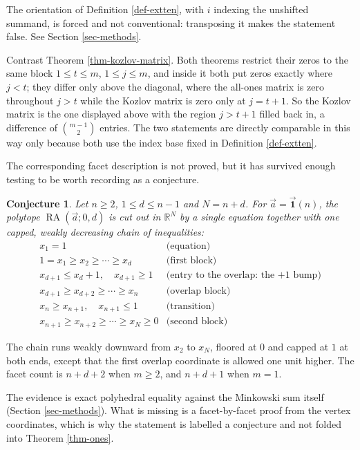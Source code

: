 \documentclass[11pt, a4paper, abstract=yes]{scrartcl}
\theoremstyle{definition}
\theoremstyle{remark}
\theoremstyle{plain}
\newtheorem{conjecture}[definition]{Conjecture}
\newcommand{\RA}{\operatorname{RA}}
\newcommand{\onesvec}{\vec{\mathbf 1}}
\begin{document}
The orientation of Definition \ref{def-extten}, with \(i\) indexing the unshifted summand, is forced
and not conventional: transposing it makes the statement false. See Section \ref{sec-methods}.

Contrast Theorem \ref{thm-kozlov-matrix}. Both theorems restrict their zeros to the same block
\(1\le t\le m\), \(1\le j\le m\), and inside it both put zeros exactly where \(j<t\); they differ
only above the diagonal, where the all-ones matrix is zero throughout \(j>t\) while the Kozlov
matrix is zero only at \(j=t+1\). So the Kozlov matrix is the one displayed above with the region
\(j>t+1\) filled back in, a difference of \(\binom{m-1}{2}\) entries. The two statements are
directly comparable in this way only because both use the index base fixed in
Definition \ref{def-extten}.

The corresponding facet description is not proved, but it has survived enough testing to be worth
recording as a conjecture.

\begin{conjecture}
Let \(n\ge2\), \(1\le d\le n-1\) and \(N=n+d\). For \(\vec a=\onesvec(n)\), the
polytope \(\RA(\vec a;0,d)\)
is cut out in \(\mathbb R^N\) by a single equation together with one capped, weakly decreasing chain
of inequalities:
\[
\begin{array}{ll}
 x_1=1 & \text{(equation)}\\[2pt]
 1=x_1\ge x_2\ge\cdots\ge x_d & \text{(first block)}\\
 x_{d+1}\le x_d+1,\quad x_{d+1}\ge1 & \text{(entry to the overlap: the \(+1\) bump)}\\
 x_{d+1}\ge x_{d+2}\ge\cdots\ge x_n & \text{(overlap block)}\\
 x_n\ge x_{n+1},\quad x_{n+1}\le1 & \text{(transition)}\\
 x_{n+1}\ge x_{n+2}\ge\cdots\ge x_N\ge0 & \text{(second block)}
\end{array}
\]
\label{conj:ones-hrep}
\label{conj-ones-hrep}
\end{conjecture}

The chain runs weakly downward from \(x_2\) to \(x_N\), floored at \(0\) and capped at \(1\) at both
ends, except that the first overlap coordinate is allowed one unit higher. The facet count is
\(n+d+2\) when \(m\ge2\), and \(n+d+1\) when \(m=1\).

The evidence is exact polyhedral equality against the Minkowski sum itself (Section
\ref{sec-methods}). What is missing is a facet-by-facet proof
from the vertex coordinates, which is why the statement is labelled a conjecture and not folded into
Theorem \ref{thm-ones}.
\end{document}

